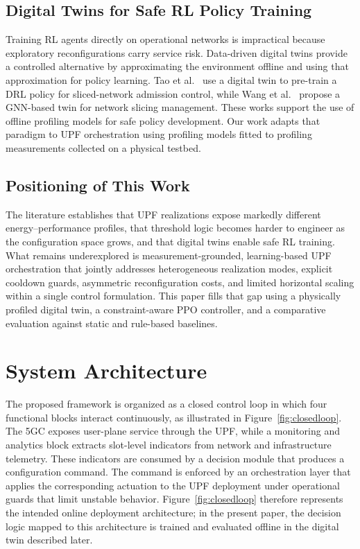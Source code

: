 \documentclass[a4paper,fleqn]{cas-sc}
\begin{document}
\subsection{Digital Twins for Safe RL Policy Training}
\label{subsec:rel_dt}

Training RL agents directly on operational networks is impractical because exploratory reconfigurations carry service risk. Data-driven digital twins provide a controlled alternative by approximating the environment offline and using that approximation for policy learning. Tao et al.~\cite{tao2025tcomm} use a digital twin to pre-train a DRL policy for sliced-network admission control, while Wang et al.~\cite{wang2022tii} propose a GNN-based twin for network slicing management. These works support the use of offline profiling models for safe policy development. Our work adapts that paradigm to UPF orchestration using profiling models fitted to profiling measurements collected on a physical testbed.

\subsection{Positioning of This Work}
\label{subsec:rel_position}

The literature establishes that UPF realizations expose markedly different energy--performance profiles, that threshold logic becomes harder to engineer as the configuration space grows, and that digital twins enable safe RL training. What remains underexplored is measurement-grounded, learning-based UPF orchestration that jointly addresses heterogeneous realization modes, explicit cooldown guards, asymmetric reconfiguration costs, and limited horizontal scaling within a single control formulation. This paper fills that gap using a physically profiled digital twin, a constraint-aware PPO controller, and a comparative evaluation against static and rule-based baselines.

\section{System Architecture}
\label{sys}

The proposed framework is organized as a closed control loop in which four functional blocks interact continuously, as illustrated in Figure~\ref{fig:closedloop}. The 5GC exposes user-plane service through the UPF, while a monitoring and analytics block extracts slot-level indicators from network and infrastructure telemetry. These indicators are consumed by a decision module that produces a configuration command. The command is enforced by an orchestration layer that applies the corresponding actuation to the UPF deployment under operational guards that limit unstable behavior. Figure~\ref{fig:closedloop} therefore represents the intended online deployment architecture; in the present paper, the decision logic mapped to this architecture is trained and evaluated offline in the digital twin described later.
\end{document}
